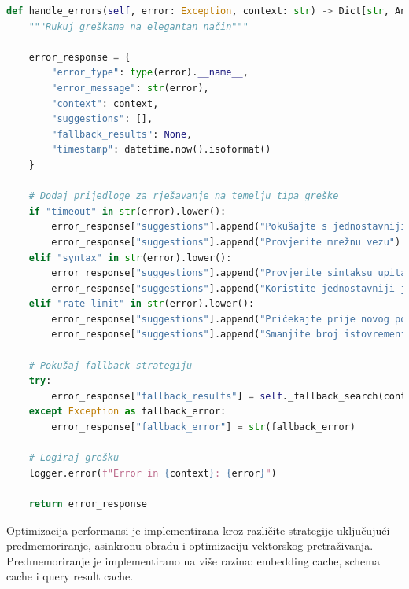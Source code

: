\begin{lstlisting}[language=Python, caption=Implementacija rukovanja greškama]
def handle_errors(self, error: Exception, context: str) -> Dict[str, Any]:
    """Rukuj greškama na elegantan način"""
    
    error_response = {
        "error_type": type(error).__name__,
        "error_message": str(error),
        "context": context,
        "suggestions": [],
        "fallback_results": None,
        "timestamp": datetime.now().isoformat()
    }
    
    # Dodaj prijedloge za rješavanje na temelju tipa greške
    if "timeout" in str(error).lower():
        error_response["suggestions"].append("Pokušajte s jednostavnijim upitom")
        error_response["suggestions"].append("Provjerite mrežnu vezu")
    elif "syntax" in str(error).lower():
        error_response["suggestions"].append("Provjerite sintaksu upita")
        error_response["suggestions"].append("Koristite jednostavniji jezik")
    elif "rate limit" in str(error).lower():
        error_response["suggestions"].append("Pričekajte prije novog pokušaja")
        error_response["suggestions"].append("Smanjite broj istovremenih zahtjeva")
    
    # Pokušaj fallback strategiju
    try:
        error_response["fallback_results"] = self._fallback_search(context)
    except Exception as fallback_error:
        error_response["fallback_error"] = str(fallback_error)
    
    # Logiraj grešku
    logger.error(f"Error in {context}: {error}")
    
    return error_response
\end{lstlisting}

Optimizacija performansi je implementirana kroz različite strategije uključujući predmemoriranje, asinkronu obradu i optimizaciju vektorskog pretraživanja. Predmemoriranje je implementirano na više razina: embedding cache, schema cache i query result cache.

